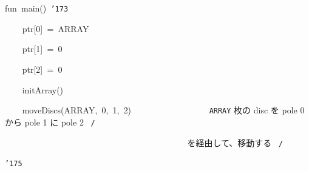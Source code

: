 \documentclass[a4paper,10pt]{article}
\def\mc{\relax}
\begin{document}
\noindent
\mbox{}\hfill

\noindent
\mbox{}fun{\tt\mc \ }main(){\tt\mc \ }{\tt\char'173}

\noindent
\mbox{}{\tt\mc \ }{\tt\mc \ }{\tt\mc \ }{\tt\mc \ }ptr[0]{\tt\mc \ }={\tt\mc \ }ARRAY

\noindent
\mbox{}{\tt\mc \ }{\tt\mc \ }{\tt\mc \ }{\tt\mc \ }ptr[1]{\tt\mc \ }={\tt\mc \ }0

\noindent
\mbox{}{\tt\mc \ }{\tt\mc \ }{\tt\mc \ }{\tt\mc \ }ptr[2]{\tt\mc \ }={\tt\mc \ }0

\noindent
\mbox{}\hfill

\noindent
\mbox{}{\tt\mc \ }{\tt\mc \ }{\tt\mc \ }{\tt\mc \ }initArray()

\noindent
\mbox{}{\tt\mc \ }{\tt\mc \ }{\tt\mc \ }{\tt\mc \ }moveDiscs(ARRAY,{\tt\mc \ }0,{\tt\mc \ }1,{\tt\mc \ }2){\tt\mc \ \ \ \ \ \ \ \ }{\tt\mc \ \ \ \ \ \ \ \ }\rm\mc {\tt /}{\tt *}\  \ {\tt ARRAY} 枚の disc を
					   pole 0 から pole 1 に pole 2
					   \hfill \rm\mc \ {\tt *}{\tt /}
\tt\mc 

\noindent
\mbox{}{\tt\mc \ \ \ \ \ \ \ \ }{\tt\mc \ \ \ \ \ \ \ \ }{\tt\mc \ \ \ \ \ \ \ \ }{\tt\mc \ \ \ \ \ \ \ \ }{\tt\mc \ \ \ \ \ \ \ \ }\rm\mc {\tt /}{\tt *}\  \ を経由して、移動する \hfill \rm\mc \ {\tt *}{\tt /}
\tt\mc 

\noindent
\mbox{}{\tt\char'175}

\rm\mc
\end{document}

